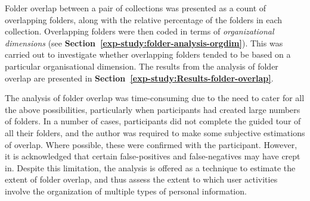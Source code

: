 Folder overlap between a pair of collections was presented as a count of overlapping folders, along with the relative percentage of the folders in each collection.  Overlapping folders were then coded in terms of \textit{organizational dimensions} (see \textbf{Section~\ref{exp-study:folder-analysis-orgdim}}). This was carried out to investigate whether overlapping folders tended to be based on a particular organisational dimension.  
The results from the analysis of folder overlap are presented in \textbf{Section~\ref{exp-study:Results-folder-overlap}}.

The analysis of folder overlap was time-consuming due to the need to cater for all the above possibilities, particularly when participants had created large numbers of folders.  In a number of cases, participants did not complete the guided tour of all their folders, and the author was required to make some subjective estimations of overlap.  Where possible, these were confirmed with the participant.  However, it is acknowledged that certain false-positives and false-negatives may have crept in.  Despite this limitation, the analysis is offered as a technique to estimate the extent of folder overlap, and thus assess the extent to which user activities involve the organization of multiple types of personal information.



